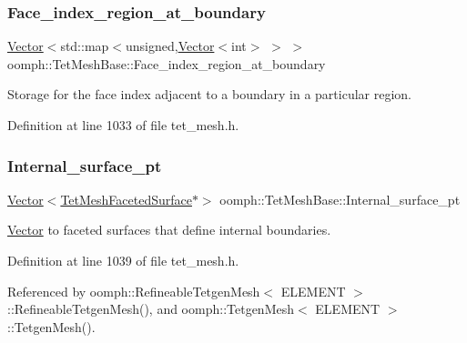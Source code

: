 \subsubsection{\texorpdfstring{Face\+\_\+index\+\_\+region\+\_\+at\+\_\+boundary}{Face\_index\_region\_at\_boundary}}
{\footnotesize\ttfamily \hyperlink{classoomph_1_1Vector}{Vector}$<$std\+::map$<$unsigned,\hyperlink{classoomph_1_1Vector}{Vector}$<$int$>$ $>$ $>$ oomph\+::\+Tet\+Mesh\+Base\+::\+Face\+\_\+index\+\_\+region\+\_\+at\+\_\+boundary\hspace{0.3cm}{\ttfamily [protected]}}



Storage for the face index adjacent to a boundary in a particular region. 



Definition at line 1033 of file tet\+\_\+mesh.\+h.

\mbox{\label{classoomph_1_1TetMeshBase_a6bcbc45a690d7878c5ca8ccf71165b83}} 
\subsubsection{\texorpdfstring{Internal\+\_\+surface\+\_\+pt}{Internal\_surface\_pt}}
{\footnotesize\ttfamily \hyperlink{classoomph_1_1Vector}{Vector}$<$\hyperlink{classoomph_1_1TetMeshFacetedSurface}{Tet\+Mesh\+Faceted\+Surface}$\ast$$>$ oomph\+::\+Tet\+Mesh\+Base\+::\+Internal\+\_\+surface\+\_\+pt\hspace{0.3cm}{\ttfamily [protected]}}



\hyperlink{classoomph_1_1Vector}{Vector} to faceted surfaces that define internal boundaries. 



Definition at line 1039 of file tet\+\_\+mesh.\+h.



Referenced by oomph\+::\+Refineable\+Tetgen\+Mesh$<$ E\+L\+E\+M\+E\+N\+T $>$\+::\+Refineable\+Tetgen\+Mesh(), and oomph\+::\+Tetgen\+Mesh$<$ E\+L\+E\+M\+E\+N\+T $>$\+::\+Tetgen\+Mesh().

\mbox{\label{classoomph_1_1TetMeshBase_a8824b79dcd8c46e4e2c1132c39bb0172}} 
